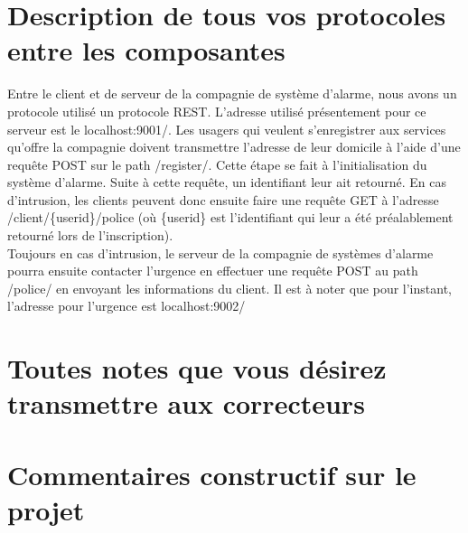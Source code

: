 
\section*{Description de tous vos protocoles entre les composantes}
Entre le client et de serveur de la compagnie de système d'alarme, nous avons un protocole utilisé un protocole REST. L'adresse utilisé présentement pour ce serveur est le localhost:9001/. Les usagers qui veulent s'enregistrer aux services qu'offre la compagnie doivent transmettre l'adresse de leur domicile à l'aide d'une requête POST sur le path /register/. Cette étape se fait à l'initialisation du système d'alarme. Suite à cette requête, un identifiant leur ait retourné. En cas d'intrusion, les clients peuvent donc ensuite faire une requête GET à l'adresse /client/\{userid\}/police (où \{userid\} est l'identifiant qui leur a été préalablement retourné lors de l'inscription). \\

Toujours en cas d'intrusion, le serveur de la compagnie de systèmes d'alarme pourra ensuite contacter l'urgence en effectuer une requête POST au path /police/ en envoyant les informations du client. Il est à noter que pour l'instant, l'adresse pour l'urgence est localhost:9002/

\section*{Toutes notes que vous désirez transmettre aux correcteurs}

\section*{Commentaires constructif sur le projet}
